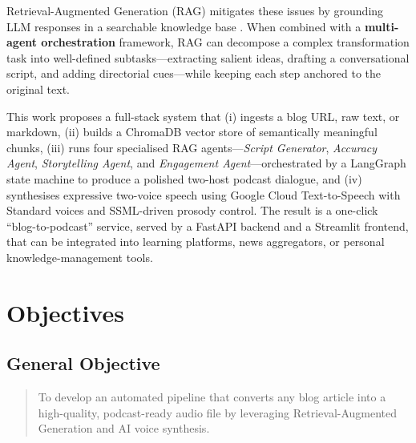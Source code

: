 \documentclass[sigconf,natbib=false]{acmart}   %
\begin{document}
Retrieval-Augmented Generation (RAG) mitigates these issues by grounding LLM responses in a searchable knowledge base \cite{Gao2022RAGSurvey}.  When combined with a \textbf{multi-agent orchestration} framework, RAG can decompose a complex transformation task into well-defined subtasks---extracting salient ideas, drafting a conversational script, and adding directorial cues---while keeping each step anchored to the original text.  

This work proposes a full-stack system that (i) ingests a blog URL, raw text, or markdown, (ii) builds a ChromaDB vector store of semantically meaningful chunks, (iii) runs four specialised RAG agents---\textit{Script Generator}, \textit{Accuracy Agent}, \textit{Storytelling Agent}, and \textit{Engagement Agent}---orchestrated by a LangGraph state machine to produce a polished two-host podcast dialogue, and (iv) synthesises expressive two-voice speech using Google Cloud Text-to-Speech \cite{GoogleCloudTTS2024} with Standard voices and SSML-driven prosody control.  The result is a one-click ``blog-to-podcast'' service, served by a FastAPI backend and a Streamlit frontend, that can be integrated into learning platforms, news aggregators, or personal knowledge-management tools.

\section{Objectives}
\label{sec:obj}
\subsection{General Objective}
\begin{quote}
   To develop an automated pipeline that converts any blog article into a high-quality, podcast-ready audio file by leveraging Retrieval-Augmented Generation and AI voice synthesis.
\end{quote}
\end{document}
